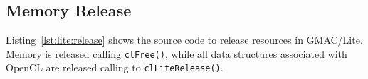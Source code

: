 

\subsection{Memory Release}
Listing~\ref{lst:lite:release} shows the source code to release resources in GMAC\slash Lite. Memory 
is released calling \texttt{clFree()}, while all data structures associated with OpenCL are released 
calling to \texttt{clLiteRelease()}.



